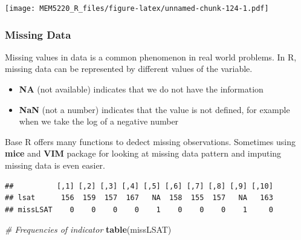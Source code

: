 \documentclass[]{book}
\newenvironment{Shaded}{\begin{snugshade}}{\end{snugshade}}
\newcommand{\CommentTok}[1]{\textcolor[rgb]{0.56,0.35,0.01}{\textit{#1}}}
\newcommand{\DataTypeTok}[1]{\textcolor[rgb]{0.13,0.29,0.53}{#1}}
\newcommand{\DecValTok}[1]{\textcolor[rgb]{0.00,0.00,0.81}{#1}}
\newcommand{\KeywordTok}[1]{\textcolor[rgb]{0.13,0.29,0.53}{\textbf{#1}}}
\newcommand{\NormalTok}[1]{#1}
\newcommand{\OperatorTok}[1]{\textcolor[rgb]{0.81,0.36,0.00}{\textbf{#1}}}
\newcommand{\StringTok}[1]{\textcolor[rgb]{0.31,0.60,0.02}{#1}}
\providecommand{\tightlist}{%
  \setlength{\itemsep}{0pt}\setlength{\parskip}{0pt}}
\begin{document}
\texttt{[image: MEM5220\_R\_files/figure-latex/unnamed-chunk-124-1.pdf]}

\hypertarget{missing-data}{%
\subsubsection{Missing Data}\label{missing-data}}

Missing values in data is a common phenomenon in real world problems. In
R, missing data can be represented by different values of the variable.

\begin{itemize}
\tightlist
\item
  \textbf{NA} (not available) indicates that we do not have the
  information
\item
  \textbf{NaN} (not a number) indicates that the value is not defined,
  for example when we take the log of a negative number
\end{itemize}

Base R offers many functions to dedect missing observations. Sometimes
using \textbf{mice} and \textbf{VIM} package for looking at missing data
pattern and imputing missing data is even easier.

\begin{Shaded}
\end{Shaded}

\begin{verbatim}
##          [,1] [,2] [,3] [,4] [,5] [,6] [,7] [,8] [,9] [,10]
## lsat      156  159  157  167   NA  158  155  157   NA   163
## missLSAT    0    0    0    0    1    0    0    0    1     0
\end{verbatim}

\begin{Shaded}
\begin{Highlighting}[]
\CommentTok{# Frequencies of indicator}
\KeywordTok{table}\NormalTok{(missLSAT)}
\end{Highlighting}
\end{Shaded}
\end{document}
